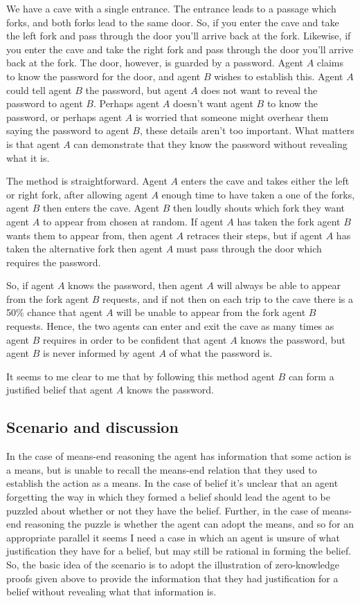 \documentclass[10pt]{article}
\begin{document}
We have a cave with a single entrance.
The entrance leads to a passage which forks, and both forks lead to the same door.
So, if you enter the cave and take the left fork and pass through the door you'll arrive back at the fork.
Likewise, if you enter the cave and take the right fork and pass through the door you'll arrive back at the fork.
The door, however, is guarded by a password.
Agent \(A\) claims to know the password for the door, and agent \(B\) wishes to establish this.
Agent \(A\) could tell agent \(B\) the password, but agent \(A\) does not want to reveal the password to agent \(B\).
Perhaps agent \(A\) doesn't want agent \(B\) to know the password, or perhaps agent \(A\) is worried that someone might overhear them saying the password to agent \(B\), these details aren't too important.
What matters is that agent \(A\) can demonstrate that they know the password without revealing what it is.

The method is straightforward.
Agent \(A\) enters the cave and takes either the left or right fork, after allowing agent \(A\) enough time to have taken a one of the forks, agent \(B\) then enters the cave.
Agent \(B\) then loudly shouts which fork they want agent \(A\) to appear from chosen at random.
If agent \(A\) has taken the fork agent \(B\) wants them to appear from, then agent \(A\) retraces their steps, but if agent \(A\) has taken the alternative fork then agent \(A\) must pass through the door which requires the password.

So, if agent \(A\) knows the password, then agent \(A\) will always be able to appear from the fork agent \(B\) requests, and if not then on each trip to the cave there is a 50\% chance that agent \(A\) will be unable to appear from the fork agent \(B\) requests.
Hence, the two agents can enter and exit the cave as many times as agent \(B\) requires in order to be confident that agent \(A\) knows the password, but agent \(B\) is never informed by agent \(A\) of what the password is.

It seems to me clear to me that by following this method agent \(B\) can form a justified belief that agent \(A\) knows the password.

\subsection{Scenario and discussion}
\label{sec:scenario-2}

In the case of means-end reasoning the agent has information that some action is a means, but is unable to recall the means-end relation that they used to establish the action as a means.
In the case of belief it's unclear that an agent forgetting the way in which they formed a belief should lead the agent to be puzzled about whether or not they have the belief.
Further, in the case of means-end reasoning the puzzle is whether the agent can adopt the means, and so for an appropriate parallel it seems I need a case in which an agent is unsure of what justification they have for a belief, but may still be rational in forming the belief.
So, the basic idea of the scenario is to adopt the illustration of zero-knowledge proofs given above to provide the information that they had justification for a belief without revealing what that information is.
\end{document}
